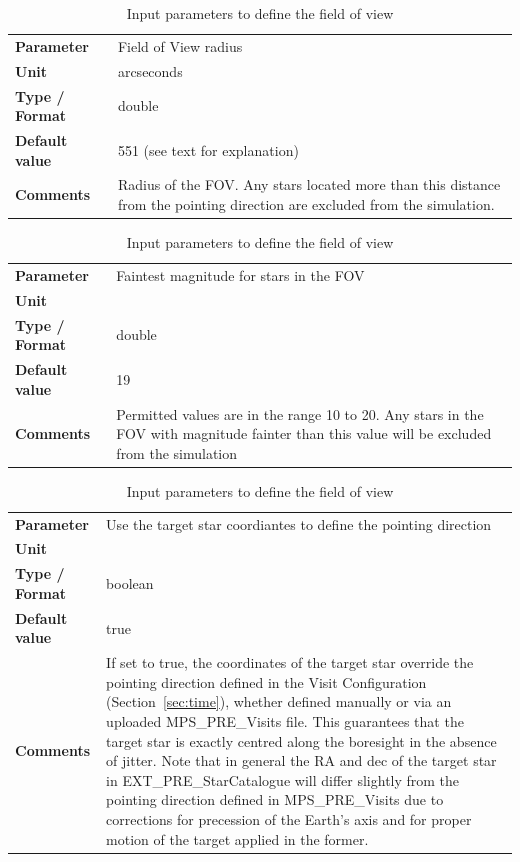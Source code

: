\documentclass[11pt]{article}      %
\def\HCode#1{}
\def\htmlanchor#1{\HCode{<a id="#1"></a>}}
\begin{document}
\begin{table}[hb]
  \caption{Input parameters to define the field of view}

  \htmlanchor{FOVradius}
  \begin{tabular}{| l | p{13cm} |}
    \hline 
    {\bf Parameter} & Field of View radius\\
    {\bf Unit} & arcseconds\\
    {\bf Type / Format} & double\\
    {\bf Default value} & 551 (see text for explanation)\\
    {\bf Comments} & Radius of the FOV.  Any stars located more than this distance from the pointing direction are excluded from the simulation.\\
    \hline
  \end{tabular}
  \bigskip

  \htmlanchor{minMagnitude}
  \begin{tabular}{| l | p{13cm} |}
    \hline 
    {\bf Parameter} & Faintest magnitude for stars in the FOV\\
    {\bf Unit} & \\
    {\bf Type / Format} & double\\
    {\bf Default value} & 19\\
    {\bf Comments} & Permitted values are in the range 10 to 20. Any stars in the FOV with magnitude fainter than this value will be excluded from the simulation\\
    \hline
  \end{tabular}
  \bigskip

  \begin{tabular}{| l | p{13cm} |}
    \hline 
    {\bf Parameter} & Use the target star coordiantes to define the pointing direction\\
    {\bf Unit} & \\
    {\bf Type / Format} & boolean\\
    {\bf Default value} & true\\
    {\bf Comments} & If set to true, the coordinates of the target star override the pointing direction defined in the Visit Configuration (Section~\ref{sec:time}), whether defined manually or via an uploaded MPS\_PRE\_Visits file. This guarantees that the target star is exactly centred along the boresight in the absence of jitter. Note that in general the RA and dec of the target star in EXT\_PRE\_StarCatalogue will differ slightly from the pointing direction defined in MPS\_PRE\_Visits due to corrections for precession of the Earth's axis and for proper motion of the target applied in the former.\\
    \hline
  \end{tabular}
  \bigskip

  \label{tab:fovInputs}
\end{table}
\end{document}
